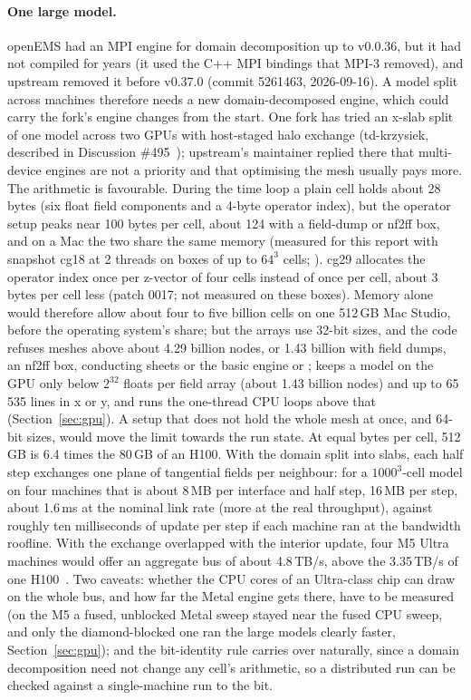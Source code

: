 \paragraph{One large model.} openEMS had an MPI engine for domain decomposition up to v0.0.36, but it had not compiled
for years (it used the C++ MPI bindings that MPI-3 removed), and upstream removed it before v0.37.0 (commit 5261463,
2026-09-16). A model split across machines therefore needs a new domain-decomposed engine, which could carry the
fork's engine changes from the start. One fork has tried an x-slab split of one model across two GPUs with
host-staged halo exchange (td-krzysiek, described in Discussion \#495~\cite{thliebig495}); upstream's maintainer
replied there that multi-device engines are not a priority and that optimising the mesh usually pays more.
The arithmetic is favourable. During the time loop a plain cell holds about 28 bytes (six float field components and a
4-byte operator index), but the operator setup peaks near 100 bytes per cell, about 124 with a field-dump or nf2ff
box, and on a Mac the two share the same memory (measured for this report with snapshot cg18 at 2 threads on boxes of
up to $64^3$ cells; ). cg29 allocates the operator index once per
z-vector of four cells instead of once per cell, about 3 bytes per cell less (patch 0017; not measured on these
boxes). Memory alone would therefore allow about four to five billion cells on one 512\,GB Mac Studio, before the
operating system's share; but the arrays use 32-bit sizes, and the code refuses meshes above about 4.29 billion nodes,
or 1.43 billion with field dumps, an nf2ff box, conducting sheets or the basic engine or ;
 keeps a model on the GPU only below $2^{32}$ floats per field array (about 1.43 billion
nodes) and up to 65\,535 lines in x or y, and runs the one-thread CPU loops above that (Section~\ref{sec:gpu}). A setup
that does not hold the whole mesh at once, and 64-bit sizes, would move the limit towards the run state. At equal
bytes per cell, 512\,GB is 6.4 times the 80\,GB of an H100. With the domain split into slabs, each half step exchanges
one plane of tangential fields per neighbour: for a $1000^3$-cell model on four machines that is about 8\,MB per
interface and half step, 16\,MB per step, about 1.6\,ms at the nominal link rate (more at the real throughput),
against roughly ten milliseconds of update per step if each machine ran at the bandwidth roofline. With the exchange
overlapped with the interior update, four M5 Ultra machines would offer an aggregate bus of about 4.8\,TB/s, above the
3.35\,TB/s of one H100~\cite{h100}. Two caveats: whether the CPU cores of an Ultra-class chip can draw on the whole
bus, and how far the Metal engine gets there, have to be measured (on the M5 a fused, unblocked Metal sweep stayed
near the fused CPU sweep, and only the diamond-blocked one ran the large models clearly faster,
Section~\ref{sec:gpu}); and the bit-identity rule carries over naturally, since a domain decomposition need not change
any cell's arithmetic, so a distributed run can be checked against a single-machine run to the bit.
